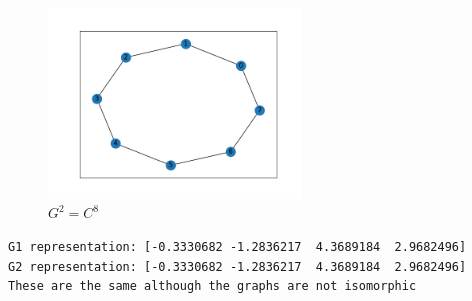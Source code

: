 \documentclass[a4paper]{article}
\begin{document}
\begin{figure}[ht]
    \centering
    \includegraphics[width=0.6\textwidth]{figures/C8.png}
    \caption{$G^2 =C^8$}
    \label{fig:c8}
\end{figure}

\begin{verbatim}
G1 representation: [-0.3330682 -1.2836217  4.3689184  2.9682496]
G2 representation: [-0.3330682 -1.2836217  4.3689184  2.9682496]
These are the same although the graphs are not isomorphic    
\end{verbatim}
% 
% 
\end{document}
